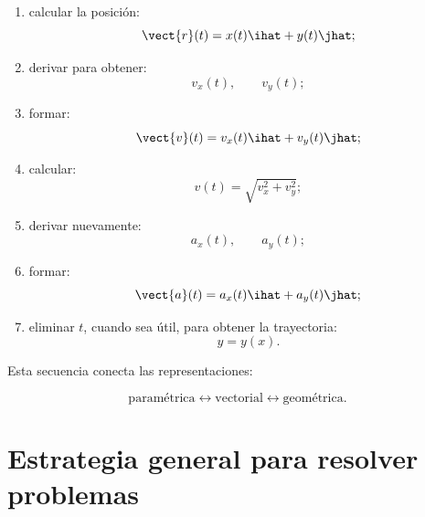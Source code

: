 \begin{enumerate}
    \item calcular la posición:
    \[
    \vect{r}(t)
    =
    x(t)\ihat+y(t)\jhat;
    \]

    \item derivar para obtener:
    \[
    v_x(t),
    \qquad
    v_y(t);
    \]

    \item formar:
    \[
    \vect{v}(t)
    =
    v_x(t)\ihat+v_y(t)\jhat;
    \]

    \item calcular:
    \[
    v(t)
    =
    \sqrt{v_x^2+v_y^2};
    \]

    \item derivar nuevamente:
    \[
    a_x(t),
    \qquad
    a_y(t);
    \]

    \item formar:
    \[
    \vect{a}(t)
    =
    a_x(t)\ihat+a_y(t)\jhat;
    \]

    \item eliminar \(t\), cuando sea útil, para obtener la trayectoria:
    \[
    y=y(x).
    \]
\end{enumerate}

Esta secuencia conecta las representaciones:

\[
\text{paramétrica}
\longleftrightarrow
\text{vectorial}
\longleftrightarrow
\text{geométrica}.
\]


\section{Estrategia general para resolver problemas}

